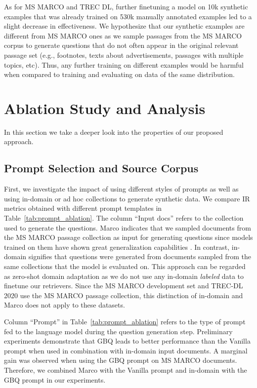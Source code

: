 \documentclass[11pt]{article}
\begin{document}
As for MS MARCO and TREC DL, further finetuning a model on 10k synthetic examples that was already trained on 530k manually annotated examples led to a slight decrease in effectiveness. We hypothesize that our synthetic examples are different from MS MARCO ones as we sample passages from the MS MARCO corpus to generate questions that do not often appear in the original relevant passage set (e.g., footnotes, texts about advertisements, passages with multiple topics, etc). Thus, any further training on different examples would be harmful when compared to training and evaluating on data of the same distribution.


\section{Ablation Study and Analysis}
In this section we take a deeper look into the properties of our proposed approach.

\subsection{Prompt Selection and Source Corpus}
\label{sec:prompt_ablation}
First, we investigate the impact of using different styles of prompts as well as using in-domain or ad hoc collections to generate synthetic data.
We compare IR metrics obtained with different prompt templates in Table~\ref{tab:prompt_ablation}. The column ``Input docs'' refers to the collection used to generate the questions.
Marco indicates that we sampled documents from the MS MARCO passage collection as input for generating questions since models trained on them have shown great generalization capabilities \cite{pradeep5h2oloo,thakur2021beir}.
In contrast, in-domain signifies that questions were generated from documents sampled from the same collections that the model is evaluated on. This approach can be regarded as zero-shot domain adaptation as we do not use any in-domain \textit{labeled} data to finetune our retrievers.
Since the MS MARCO development set and TREC-DL 2020 use the MS MARCO passage collection, this distinction of in-domain and Marco does not apply to these datasets.

Column ``Prompt'' in Table~\ref{tab:prompt_ablation} refers to the type of prompt fed to the language model during the question generation step. Preliminary experiments demonstrate that GBQ leads to better performance than the Vanilla prompt when used in combination with in-domain input documents. A marginal gain was observed when using the GBQ prompt on MS MARCO documents. Therefore, we combined Marco with the Vanilla prompt and in-domain with the GBQ prompt in our experiments.
\end{document}
